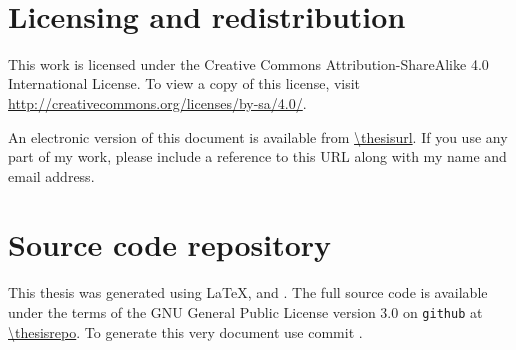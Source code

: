 \newpage
\thispagestyle{plain}
\
\vfill
\section*{Licensing and redistribution}

This work is licensed under the Creative Commons Attribution-ShareAlike 4.0
International License.
To view a copy of this license,
visit \url{http://creativecommons.org/licenses/by-sa/4.0/}.
\begin{center}
\end{center}
An electronic version of this document is available from
\url{\thesisurl}.
If you use any part of my work,
please include a reference to this URL along with my name and email address.

\section*{Source code repository}
This thesis was generated using \LaTeX, \python and \molsturm.
The full source code is available
under the terms of the GNU General Public License version 3.0
on \texttt{github} at \url{\thesisrepo}.
To generate this very document use commit \texttt{\gitcommit}.
